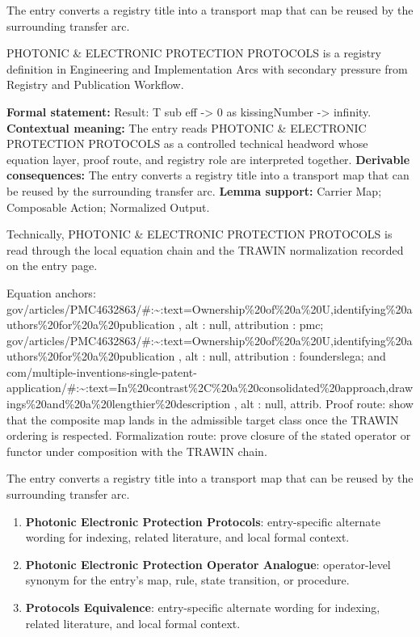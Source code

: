 The entry converts a registry title into a transport map that can be reused by the surrounding transfer arc.
\clearpage


\begingroup\small
{}
PHOTONIC \& ELECTRONIC PROTECTION PROTOCOLS is a registry definition in Engineering and Implementation Arcs with secondary pressure from Registry and Publication Workflow.

\begingroup\footnotesize\setlength{\emergencystretch}{3em}\sloppy
\textbf{Formal statement:} Result: T sub eff -> 0 as kissingNumber -> infinity. \textbf{Contextual meaning:} The entry reads PHOTONIC \& ELECTRONIC PROTECTION PROTOCOLS as a controlled technical headword whose equation layer, proof route, and registry role are interpreted together. \textbf{Derivable consequences:} The entry converts a registry title into a transport map that can be reused by the surrounding transfer arc. \textbf{Lemma support:} Carrier Map; Composable Action; Normalized Output.\par
\endgroup

Technically, PHOTONIC \& ELECTRONIC PROTECTION PROTOCOLS is read through the local equation chain and the TRAWIN normalization recorded on the entry page.

Equation anchors: gov/articles/PMC4632863/\#:\textasciitilde{}:text=Ownership\%20of\%20a\%20U,identifying\%20authors\%20for\%20a\%20publication , alt : null, attribution : pmc; gov/articles/PMC4632863/\#:\textasciitilde{}:text=Ownership\%20of\%20a\%20U,identifying\%20authors\%20for\%20a\%20publication , alt : null, attribution : founderslega; and com/multiple-inventions-single-patent-application/\#:\textasciitilde{}:text=In\%20contrast\%2C\%20a\%20consolidated\%20approach,drawings\%20and\%20a\%20lengthier\%20description , alt : null, attrib. Proof route: show that the composite map lands in the admissible target class once the TRAWIN ordering is respected. Formalization route: prove closure of the stated operator or functor under composition with the TRAWIN chain.

The entry converts a registry title into a transport map that can be reused by the surrounding transfer arc.
\endgroup

\begin{enumerate}[leftmargin=1.6em,itemsep=6pt,topsep=4pt]
\item \textbf{Photonic Electronic Protection Protocols}: entry-specific alternate wording for indexing, related literature, and local formal context.
\item \textbf{Photonic Electronic Protection Operator Analogue}: operator-level synonym for the entry's map, rule, state transition, or procedure.
\item \textbf{Protocols Equivalence}: entry-specific alternate wording for indexing, related literature, and local formal context.
\end{enumerate}

